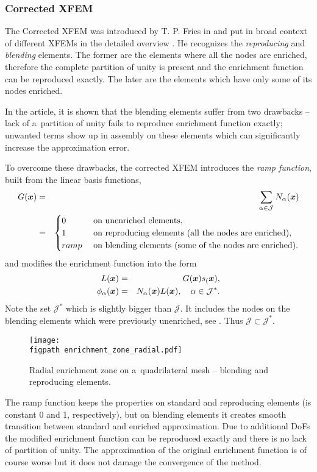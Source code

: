 \subsubsection{Corrected XFEM} \label{sec:corrected_xfem}
The Corrected XFEM was introduced by T. P. Fries in \cite{fries_corrected_2008} and put in broad context of different XFEMs in the detailed overview \cite{fries_xfem_overview_2010}.
He recognizes the \emph{reproducing} and \emph{blending} elements.
The former are the elements where all the nodes are enriched, therefore the complete partition of unity is present
and the enrichment function can be reproduced exactly. The later are the elements which have only some of its nodes enriched.

In the article, it is shown that the blending elements suffer from two drawbacks -- lack of a~partition of unity fails to reproduce enrichment function exactly;
unwanted terms show up in assembly on these elements which can significantly increase the approximation error.
 
To overcome these drawbacks, the corrected XFEM introduces the \emph{ramp function}, built from the linear basis functions,
\begin{eqnarray} \label{eqn:ramp_function}
  G(\mathbf{\boldsymbol{x}}) &=& \sum_{\alpha\in\mathcal{J}} N_\alpha(\mathbf{\boldsymbol{x}})    \\
  &=& 
  \begin{cases}
    0 & \textrm{ on unenriched elements,}    \\
    1 & \textrm{ on reproducing elements (all the nodes are enriched),}    \\
    ramp & \textrm{ on blending elements (some of the nodes are enriched).}    \\
  \end{cases} \nonumber
\end{eqnarray}
and modifies the enrichment function into the form
\begin{eqnarray} \label{eqn:xfem_ramp}
    L(\mathbf{\boldsymbol{x}}) &=& G(\mathbf{\boldsymbol{x}}) s_(\mathbf{\boldsymbol{x}}),\\
    \phi_{\alpha}(\mathbf{\boldsymbol{x}}) &=& N_\alpha(\mathbf{\boldsymbol{x}})L(\mathbf{\boldsymbol{x}}), \quad \alpha\in\mathcal{J}^*.
\end{eqnarray}
Note the set $\mathcal{J}^*$ which is slightly bigger than $\mathcal{J}$. It includes the nodes on the blending
elements which were previously unenriched, see . Thus $\mathcal{J}\subset\mathcal{J}^*$.
%
\begin{figure}[!htb]
  \centering    
    \texttt{[image: \\figpath enrichment\_zone\_radial.pdf]}
  \caption[Radial enrichment zone]{Radial enrichment zone on a~quadrilateral mesh -- blending and reproducing elements.}
  \label{fig:enrichment_zone_radial}
\end{figure}
%
The ramp function keeps the properties on standard and reproducing elements (is constant 0 and 1, respectively),
but on blending elements it creates smooth transition between standard and enriched approximation. Due to
additional DoFs the modified enrichment function can be reproduced exactly and there is no lack of partition of unity.
The approximation of the original enrichment function is of course worse but it does not damage the convergence of the method.


